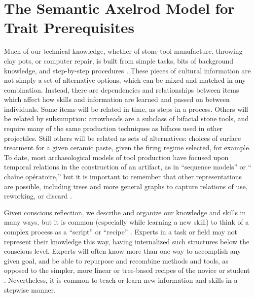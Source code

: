 \section{The Semantic Axelrod Model for Trait
Prerequisites}\label{semax:sec:the-semantic-axelrod-model-for-trait-prerequisites}

Much of our technical knowledge, whether of stone tool manufacture,
throwing clay pots, or computer repair, is built from simple tasks, bits
of background knowledge, and step-by-step procedures
\citep{neff1992ceramics, Schiffer1987}. These pieces of cultural
information are not simply a set of alternative options, which can be
mixed and matched in any combination. Instead, there are dependencies
and relationships between items which affect how skills and information
are learned and passed on between individuals. Some items will be
related in time, as steps in a process. Others will be related by
subsumption: arrowheads are a subclass of bifacial stone tools, and
require many of the same production techniques as bifaces used in other
projectiles. Still others will be related as sets of alternatives:
choices of surface treatment for a given ceramic paste, given the firing
regime selected, for example. To date, most archaeological models of
tool production have focused upon temporal relations in the construction
of an artifact, as in ``sequence models'' or
``$\textrm{cha\^ine op\'eratoire}$,'' but it is important to remember
that other representations are possible, including trees and more
general graphs to capture relations of use, reworking, or discard
\citep{Bamforth:2008kq, Bleed:2008in, Ferguson:2008ce, Hogberg:2008fj, bleed2001trees, bleed2002obviously, Schiffer1987, stout2002skill}.

Given conscious reflection, we describe and organize our knowledge and
skills in many ways, but it is common (especially while learning a new
skill) to think of a complex process as a ``script'' or ``recipe''
\citep{schank1977scripts}. Experts in a task or field may not represent
their knowledge this way, having internalized such structures below the
conscious level. Experts will often know more than one way to accomplish
any given goal, and be able to repurpose and recombine methods and
tools, as opposed to the simpler, more linear or tree-based recipes of
the novice or student
\citep[e.g.,][]{Bleed:2008in, bleed2002obviously, stout2002skill}.
Nevertheless, it is common to teach or learn new information and skills
in a stepwise manner.

